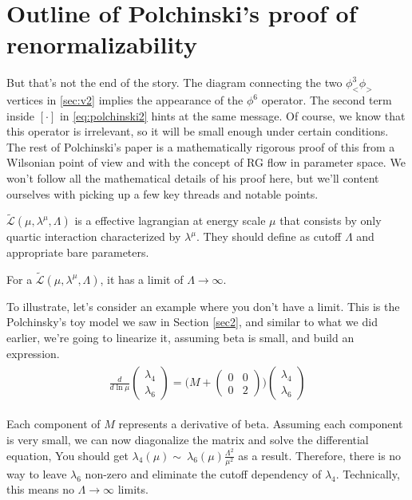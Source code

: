 \documentclass[12pt,halfline,a4paper]{ouparticle}
\begin{document}
\section{Outline of Polchinski's proof of renormalizability}
But that's not the end of the story. The diagram connecting the two $\phi_<^3\phi_>$ vertices in \ref{sec:v2} implies the appearance of the $\phi^6$ operator. The second term inside $[\cdot]$ in \ref{eq:polchinski2} hints at the same message.
Of course, we know that this operator is irrelevant, so it will be small enough under certain conditions. The rest of Polchinski's paper is a mathematically rigorous proof of this from a Wilsonian point of view and with the concept of RG flow in parameter space.
We won't follow all the mathematical details of his proof here, but we'll content ourselves with picking up a few key threads and notable points.
\begin{definition}
	$\tilde{\mathcal L}(\mu,\lambda^\mu,\Lambda)$ is a effective lagrangian at energy scale $\mu$ that consists by only quartic interaction characterized by $\lambda^\mu$. They should define as cutoff $\Lambda$ and appropriate bare parameters.
\end{definition}
\begin{theorem}
	\label{thm:renormalizability}
	For a $\tilde{\mathcal L}(\mu,\lambda^\mu,\Lambda)$, it has a limit of $\Lambda\rightarrow\infty$.
\end{theorem}
To illustrate, let's consider an example where you don't have a limit. This is the Polchinsky's toy model we saw in Section \ref{sec2}, and similar to what we did earlier, we're going to linearize it, assuming beta is small, and build an expression.
\begin{align}
	\label{eq:nolimittoyexample}
	\begin{split}
		\frac{d}{d\ln \mu}\begin{pmatrix}
			\lambda_4\\\lambda_6
		\end{pmatrix}=\bigg(M+\begin{pmatrix}
			0&0\\0&2
		\end{pmatrix}\bigg)	\begin{pmatrix}
			\lambda_4\\\lambda_6
		\end{pmatrix}
	\end{split}
\end{align}

Each component of $M$ represents a derivative of beta. Assuming each component is very small, we can now diagonalize the matrix and solve the differential equation, You should get $\lambda_4(\mu)\sim~\lambda_6(\mu)\frac{\Lambda^2}{\mu^2}$ as a result.
Therefore, there is no way to leave $\lambda_6$ non-zero and eliminate the cutoff dependency of $\lambda_4$. Technically, this means no $\Lambda\rightarrow\infty$ limits.
\end{document}
